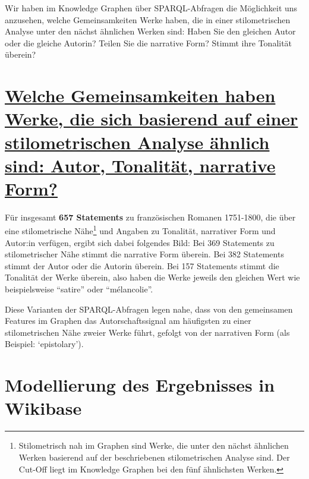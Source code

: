 \documentclass[
  12pt,
  letterpaper,
  DIV=11,
  numbers=noendperiod]{scrreprt}
\begin{document}
Wir haben im Knowledge Graphen über SPARQL-Abfragen die Möglichkeit uns
anzusehen, welche Gemeinsamkeiten Werke haben, die in einer
stilometrischen Analyse unter den nächst ähnlichen Werken sind: Haben
Sie den gleichen Autor oder die gleiche Autorin? Teilen Sie die
narrative Form? Stimmt ihre Tonalität überein?

\section{\texorpdfstring{\href{https://tinyurl.com/24q38l55}{Welche
Gemeinsamkeiten haben Werke, die sich basierend auf einer
stilometrischen Analyse ähnlich sind: Autor, Tonalität, narrative
Form?}}{Welche Gemeinsamkeiten haben Werke, die sich basierend auf einer stilometrischen Analyse ähnlich sind: Autor, Tonalität, narrative Form?}}\label{welche-gemeinsamkeiten-haben-werke-die-sich-basierend-auf-einer-stilometrischen-analyse-uxe4hnlich-sind-autor-tonalituxe4t-narrative-form}

Für insgesamt \textbf{657 Statements} zu französischen Romanen
1751-1800, die über eine stilometrische Nähe\footnote{Stilometrisch nah
  im Graphen sind Werke, die unter den nächst ähnlichen Werken basierend
  auf der beschriebenen stilometrischen Analyse sind. Der Cut-Off liegt
  im Knowledge Graphen bei den fünf ähnlichsten Werken.} und Angaben zu
Tonalität, narrativer Form und Autor:in verfügen, ergibt sich dabei
folgendes Bild: Bei 369 Statements zu stilometrischer Nähe stimmt die
narrative Form überein. Bei 382 Statements stimmt der Autor oder die
Autorin überein. Bei 157 Statements stimmt die Tonalität der Werke
überein, also haben die Werke jeweils den gleichen Wert wie
beispielsweise ``satire'' oder ``mélancolie''.

Diese Varianten der SPARQL-Abfragen legen nahe, dass von den gemeinsamen
Features im Graphen das Autorschaftssignal am häufigsten zu einer
stilometrischen Nähe zweier Werke führt, gefolgt von der narrativen Form
(als Beispiel: `epistolary').

\section{Modellierung des Ergebnisses in
Wikibase}\label{modellierung-des-ergebnisses-in-wikibase}
\end{document}
